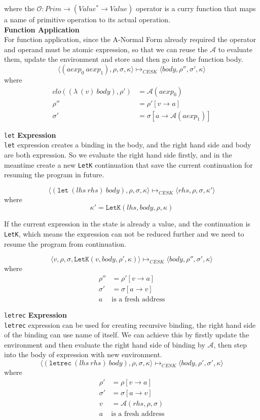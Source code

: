 \documentclass[paper=a4, fontsize=11pt]{scrartcl} %
\numberwithin{equation}{section} %
\numberwithin{figure}{section} %
\numberwithin{table}{section} %
\begin{document}
where the $\mathcal{O} : Prim \rightarrow (Value^* \rightarrow Value)$ operator is a curry function that maps a name of primitive operation to its actual operation.\\

\textbf{Function Application}\\
For function application, since the A-Normal Form already required the operator and operand must be atomic expression, so that we can reuse the $\mathcal{A}$ to evaluate them, update the environment and store and then go into the function body.
$$ \langle (aexp_0~aexp_1), \rho, \sigma, \kappa \rangle \longmapsto_{CESK} \langle body, \rho'', \sigma', \kappa \rangle $$
where 
\begin{align*}
clo((\lambda~(v)~body), \rho') & = \mathcal{A}(aexp_0) \\
\rho'' & = \rho'[v \rightarrow a] \\
\sigma' & = \sigma[a \rightarrow \mathcal{A}(aexp_1)]
\end{align*}

\texttt{let} \textbf{Expression}\\
\texttt{let} expression creates a binding in the body, and the right hand side and body are both expression. So we evaluate the right hand side firstly, and in the meantime create a new \texttt{LetK} continuation that save the current continuation for resuming the program in future.

$$ \langle (\texttt{let}~(lhs~rhs)~body), \rho, \sigma, \kappa \rangle \longmapsto_{CESK} \langle rhs, \rho, \sigma, \kappa' \rangle $$
where
$$ \kappa' = \texttt{LetK}(lhs, body, \rho, \kappa) $$

If the current expression in the state is already a value, and the continuation is \texttt{LetK}, which means the expression can not be reduced further and we need to resume the program from continuation.

$$ \langle v, \rho, \sigma, \texttt{LetK}(v, body, \rho', \kappa) \rangle \longmapsto_{CESK} \langle body, \rho'', \sigma', \kappa \rangle $$
where
\begin{align*}
\rho'' & = \rho'[v \rightarrow a] \\
\sigma' & = \sigma[a \rightarrow v] \\
a~&\mbox{is a fresh address}
\end{align*}

\texttt{letrec} \textbf{Expression}\\
\texttt{letrec} expression can be used for creating recursive binding, the right hand side of the binding can use name of itself. We can achieve this by firstly update the environment and then evaluate the right hand side of binding by $\mathcal{A}$, then step into the body of expression with new environment.
$$ \langle (\texttt{letrec}~(lhs~rhs)~body), \rho, \sigma, \kappa \rangle \longmapsto_{CESK} \langle body, \rho', \sigma', \kappa \rangle $$
where
\begin{align*}
\rho' & = \rho[v \rightarrow a] \\
\sigma' & = \sigma[a \rightarrow v] \\
v & = \mathcal{A}(rhs, \rho, \sigma) \\
a~&\mbox{is a fresh address}
\end{align*}
\end{document}
